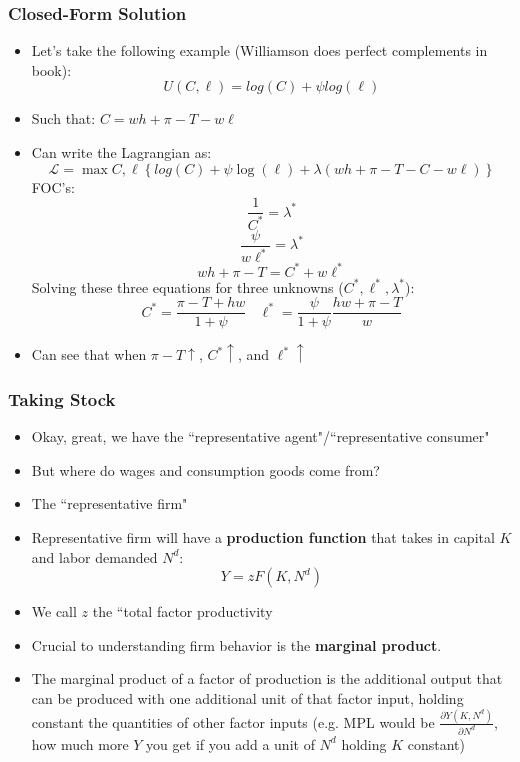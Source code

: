 \documentclass{beamer}
\begin{document}
\begin{frame}
\frametitle[alignment=center]{Closed-Form Solution}
\begin{itemize}
\item Let's take the following example (Williamson does perfect complements in book):
$$U(C,\ell)=log(C)+\psi log(\ell)$$
\item Such that: $C=wh+\pi-T-w\ell$
\item Can write the Lagrangian as:
$$\mathcal{L}=\max{C,\ell}\left\{log(C)+\psi \log(\ell)+\lambda\left(wh+\pi-T-C-w\ell\right)\right\}$$
FOC's:
$$\frac{1}{C^*}=\lambda^*$$
$$\frac{\psi}{w\ell^*}=\lambda^*$$
$$wh+\pi-T=C^*+w\ell^*$$
Solving these three equations for three unknowns ($C^*,\ell^*,\lambda^*$):
$$C^*=\frac{\pi-T+hw}{1+\psi}\ \ \ \ \ell^*=\frac{\psi}{1+\psi}\frac{hw+\pi-T}{w}$$
\item Can see that when $\pi-T\uparrow$, $C^*\uparrow$, and $\ell^*\uparrow$
\end{itemize}
\end{frame}

\begin{frame}
\frametitle[alignment=center]{Taking Stock}
\begin{itemize}
\item Okay, great, we have the ``representative agent"/``representative consumer"
\bigskip
\item But where do wages and consumption goods come from?  
\bigskip
\item The ``representative firm" 
\bigskip
\item Representative firm will have a \textbf{production function} that takes in capital $K$ and labor demanded $N^d$:
$$Y=zF(K,N^d)$$
\item We call $z$ the ``total factor productivity
\item Crucial to understanding firm behavior is the \textbf{marginal product}.
\item The marginal product of a factor of production is the additional output that can be produced with one additional unit of that factor input, holding constant the quantities of other factor inputs (e.g. MPL would be $\frac{\partial Y(K,N^d)}{\partial N^d}$, how much more $Y$ you get if you add a unit of $N^d$ holding $K$ constant)
\end{itemize}
\end{frame}
\end{document}
